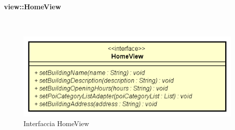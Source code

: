 \documentclass[../DefinizioneDiProdotto.tex]{subfiles}
\begin{document}
\paragraph{view::HomeView}
\
\begin{figure}[H]
	\centering
	\includegraphics[width=\maxwidth]{img/HomeView.png}
	\caption{Interfaccia HomeView}\label{fig:view::HomeView} 
\end{figure}
\end{document}
